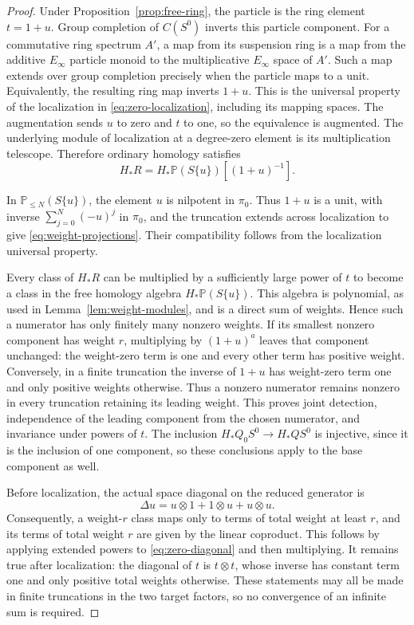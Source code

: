 \begin{proof}
Under Proposition~\ref{prop:free-ring}, the particle is the ring
element $t=1+u$. Group completion of $C(S^0)$ inverts this particle
component. For a commutative ring spectrum $A'$, a map from its
suspension ring is a map from the additive $E_\infty$ particle monoid
to the multiplicative $E_\infty$ space of $A'$. Such a map extends
over group completion precisely when the particle maps to a unit.
Equivalently, the resulting ring map inverts $1+u$. This is the
universal property of the localization in
\eqref{eq:zero-localization}, including its mapping spaces. The
augmentation sends $u$ to zero and $t$ to one, so the equivalence is
augmented. The underlying module of localization at a degree-zero
element is its multiplication telescope. Therefore ordinary
homology satisfies
\[
 H_*R=H_*\mathbb P(S\{u\})[(1+u)^{-1}].
\]

In $\mathbb P_{\leq N}(S\{u\})$, the element $u$ is nilpotent in
$\pi_0$. Thus $1+u$ is a unit, with inverse
$\sum_{j=0}^N(-u)^j$ in $\pi_0$, and the truncation extends across
localization to give \eqref{eq:weight-projections}. Their
compatibility follows from the localization universal property.

Every class of $H_*R$ can be multiplied by a sufficiently large
power of $t$ to become a class in the free homology algebra
$H_*\mathbb P(S\{u\})$. This algebra is polynomial, as used in
Lemma~\ref{lem:weight-modules}, and is a direct sum of weights.
Hence such a numerator has only finitely many nonzero weights.
If its smallest nonzero component has weight $r$, multiplying by
$(1+u)^a$ leaves that component unchanged: the weight-zero term is
one and every other term has positive weight. Conversely, in a
finite truncation the inverse of $1+u$ has weight-zero term one
and only positive weights otherwise. Thus a nonzero numerator
remains nonzero in every truncation retaining its leading weight.
This proves joint detection, independence of the leading component
from the chosen numerator, and invariance under powers of $t$.
The inclusion $H_*Q_0S^0\to H_*QS^0$ is injective, since it is the
inclusion of one component, so these conclusions apply to the base
component as well.

Before localization, the actual space diagonal on the reduced
generator is
\begin{equation}\label{eq:zero-diagonal}
 \Delta u=u\otimes1+1\otimes u+u\otimes u.
\end{equation}
Consequently, a weight-$r$ class maps only to terms of total weight
at least $r$, and its terms of total weight $r$ are given by the
linear coproduct. This follows by applying extended powers to
\eqref{eq:zero-diagonal} and then multiplying. It remains true
after localization: the diagonal of $t$ is $t\otimes t$, whose
inverse has constant term one and only positive total weights
otherwise. These statements may all be made in finite truncations
in the two target factors, so no convergence of an infinite sum
is required.


\end{proof}
